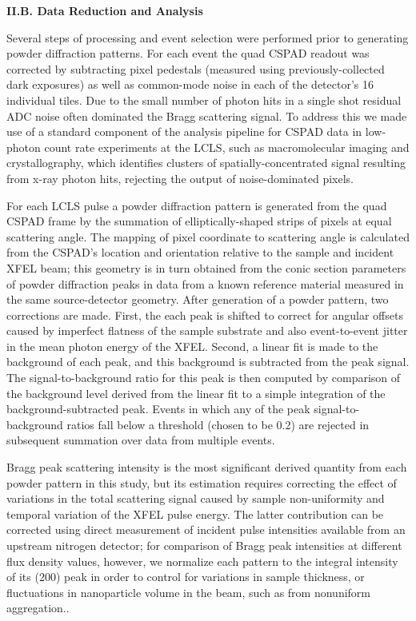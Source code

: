 \textbf{II.B. Data Reduction and Analysis}

Several steps of processing and event selection were performed prior to
generating powder diffraction patterns. For each event the quad CSPAD
readout was corrected by subtracting pixel pedestals (measured using
previously-collected dark exposures) as well as common-mode noise in
each of the detector's 16 individual tiles. \cite{HART2012CSPAD} Due to the small
number of photon hits in a single shot residual ADC noise often
dominated the Bragg scattering signal. To address this we made use of a
standard component of the analysis pipeline for CSPAD data in low-photon
count rate experiments at the LCLS, such as macromolecular imaging and
crystallography, which identifies clusters of spatially-concentrated
signal resulting from x-ray photon hits, rejecting the output of
noise-dominated pixels. \cite{DAMIANI2016LINAC}

For each LCLS pulse a powder diffraction pattern is generated from the
quad CSPAD frame by the summation of elliptically-shaped strips of
pixels at equal scattering angle. The mapping of pixel coordinate to
scattering angle is calculated from the CSPAD's location and orientation
relative to the sample and incident XFEL beam; this geometry is in turn
obtained from the conic section parameters of powder diffraction peaks
in data from a known reference material measured in the same
source-detector geometry. After generation of a powder pattern, two
corrections are made. First, the each peak is shifted to correct for
angular offsets caused by imperfect flatness of the sample substrate and
also event-to-event jitter in the mean photon energy of the XFEL.
Second, a linear fit is made to the background of each peak, and this
background is subtracted from the peak signal. The signal-to-background
ratio for this peak is then computed by comparison of the background
level derived from the linear fit to a simple integration of the
background-subtracted peak. Events in which any of the peak
signal-to-background ratios fall below a threshold (chosen to be 0.2)
are rejected in subsequent summation over data from multiple events.

Bragg peak scattering intensity is the most significant derived quantity
from each powder pattern in this study, but its estimation requires
correcting the effect of variations in the total scattering signal
caused by sample non-uniformity and temporal variation of the XFEL pulse
energy. The latter contribution can be corrected using direct
measurement of incident pulse intensities available from an upstream
nitrogen detector; for comparison of Bragg peak intensities at different
flux density values, however, we normalize each pattern to the integral
intensity of its (200) peak in order to control for variations in sample
thickness, or fluctuations in nanoparticle volume in the beam, such as
from nonuniform aggregation..

